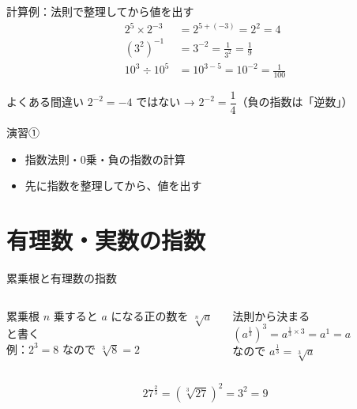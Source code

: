 \documentclass[aspectratio=169]{beamer}
\begin{document}
\begin{frame}{計算例：法則で整理してから値を出す}
  \begin{align*}
    2^5 \times 2^{-3} &= 2^{5 + (-3)} = 2^2 = 4 \\[0.5ex]
    (3^2)^{-1} &= 3^{-2} = \frac{1}{3^2} = \frac{1}{9} \\[0.5ex]
    10^3 \div 10^5 &= 10^{3 - 5} = 10^{-2} = \frac{1}{100}
  \end{align*}
  \begin{alertblock}{よくある間違い}
    $2^{-2} = -4$ ではない \quad → \quad $2^{-2} = \dfrac{1}{4}$（負の指数は「逆数」）
  \end{alertblock}
\end{frame}

\begin{frame}{演習①}
  \bigskip
  \begin{itemize}
    \item 指数法則・0乗・負の指数の計算
    \item 先に指数を整理してから、値を出す
  \end{itemize}
\end{frame}

\section{有理数・実数の指数}

\begin{frame}{累乗根と有理数の指数}
  \begin{columns}[t]
      \begin{block}{累乗根}
        $n$ 乗すると $a$ になる正の数を $\sqrt[n]{a}$ と書く\\[0.5ex]
        例：$2^3 = 8$ なので $\sqrt[3]{8} = 2$
      \end{block}
      \begin{block}{法則から決まる}
        $\left(a^{\frac13}\right)^3 = a^{\frac13 \times 3} = a^1 = a$\\[0.5ex]
        なので $a^{\frac13} = \sqrt[3]{a}$
      \end{block}
  \end{columns}
  \medskip
  \[
    27^{\frac23} = \left(\sqrt[3]{27}\right)^2 = 3^2 = 9
  \]
\end{frame}
\end{document}
